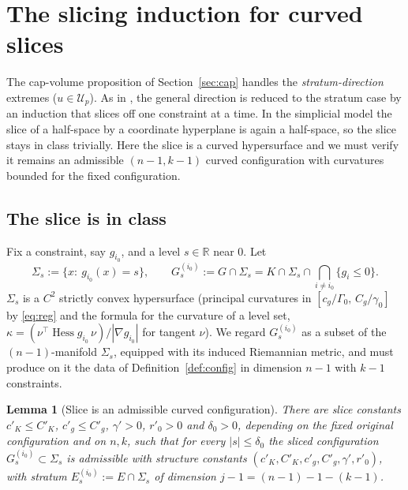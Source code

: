 \documentclass[11pt]{article}
\newtheorem{lemma}[theorem]{Lemma}
\newcommand{\R}{\mathbb{R}}
\newcommand{\Hess}{\operatorname{Hess}}
\begin{document}
\section{The slicing induction for curved slices}\label{sec:slice}

The cap-volume proposition of Section~\ref{sec:cap} handles the
\emph{stratum-direction} extremes ($u\in\mathcal U_p$).  As in
\cite{companion11}, the general direction is reduced to the stratum case by an
induction that slices off one constraint at a time.  In the simplicial model
the slice of a half-space by a coordinate hyperplane is again a half-space, so
the slice stays in class trivially.  Here the slice is a curved hypersurface
and we must verify it remains an admissible $(n-1,k-1)$ curved configuration
with curvatures bounded for the fixed configuration.

\subsection{The slice is in class}\label{ss:inclass}

Fix a constraint, say $g_{i_0}$, and a level $s\in\R$ near $0$.  Let
\[
\Sigma_s:=\{x:\ g_{i_0}(x)=s\},
\qquad
G^{(i_0)}_s:=G\cap\Sigma_s
=K\cap\Sigma_s\cap\bigcap_{i\ne i_0}\{g_i\le0\}.
\]
$\Sigma_s$ is a $C^2$ strictly convex hypersurface (principal curvatures in
$[c_g/\Gamma_0,\,C_g/\gamma_0]$ by \eqref{eq:reg} and the formula for the
curvature of a level set, $\kappa=(\nu^\top\Hess g_{i_0}\,\nu)/|\nabla
g_{i_0}|$ for tangent $\nu$).  We regard $G^{(i_0)}_s$ as a subset of the
$(n-1)$-manifold $\Sigma_s$, equipped with its induced Riemannian metric, and
must produce on it the data of Definition~\ref{def:config} in dimension $n-1$
with $k-1$ constraints.

\begin{lemma}[Slice is an admissible curved configuration]\label{lem:slice}
There are slice constants $c'_K\le C'_K$, $c'_g\le C'_g$, $\gamma'>0$,
$r'_0>0$ and $\delta_0>0$, depending on the fixed original configuration
and on $n,k$, such that for every $|s|\le\delta_0$ the sliced configuration
$G^{(i_0)}_s\subset\Sigma_s$ is admissible with structure constants
$(c'_K,C'_K,c'_g,C'_g,\gamma',r'_0)$, with stratum
$E^{(i_0)}_s:=E\cap\Sigma_s$ of dimension $j-1=(n-1)-1-(k-1)$.
\end{lemma}
\end{document}
